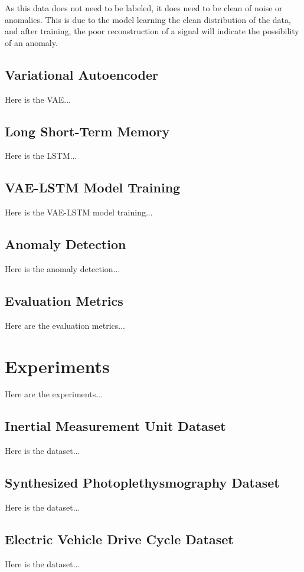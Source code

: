 \documentclass[conference]{IEEEtran}
\begin{document}
As this data does not need to be labeled, it does need to be clean of noise or anomalies. This is due to the model learning the clean distribution of the data, and after training, the poor reconstruction of a signal will indicate the possibility of an anomaly.


\subsection{Variational Autoencoder}
Here is the VAE...

\subsection{Long Short-Term Memory}
Here is the LSTM...

\subsection{VAE-LSTM Model Training}
Here is the VAE-LSTM model training...

\subsection{Anomaly Detection}
Here is the anomaly detection...

\subsection{Evaluation Metrics}
Here are the evaluation metrics...


\section{Experiments}
Here are the experiments...

\subsection{Inertial Measurement Unit Dataset}
Here is the dataset...

\subsection{Synthesized Photoplethysmography Dataset}
Here is the dataset...

\subsection{Electric Vehicle Drive Cycle Dataset}
Here is the dataset...
\end{document}
